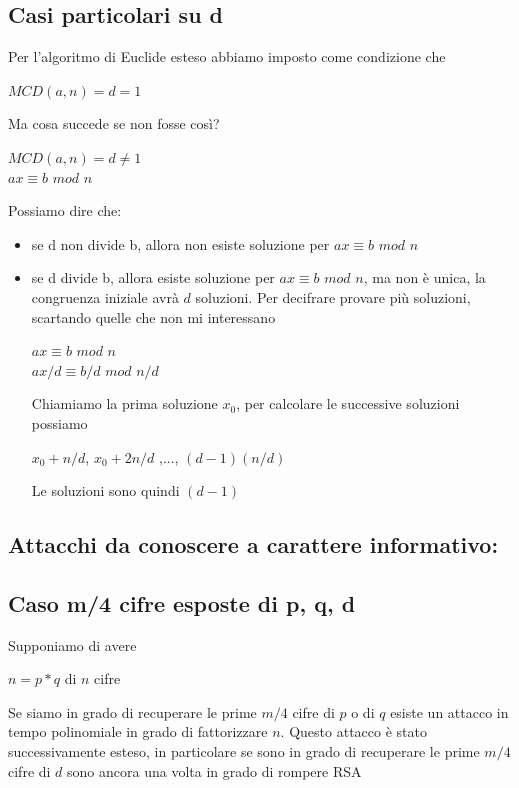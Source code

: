 \documentclass[11pt, oneside]{article}   	%
\begin{document}
\subsection*{Casi particolari su d}
Per l'algoritmo di Euclide esteso abbiamo imposto come condizione che \begin{center}
$MCD(a,n) = d = 1$
\end{center}
Ma cosa succede se non fosse così?
\begin{center}
$MCD(a,n) = d \neq 1$\\
$ax \equiv b$ $mod$ $n$
\end{center}
Possiamo dire che:\begin{itemize}
\item se d non divide b, allora non esiste soluzione per $ax \equiv b$ $mod$ $n$
\item se d divide b, allora esiste soluzione per $ax \equiv b$ $mod$ $n$, ma non è unica, la congruenza iniziale avrà $d$ soluzioni. Per decifrare provare più soluzioni, scartando quelle che non mi interessano
\begin{center}
$ax \equiv b$ $mod$ $n$\\
$ax/d \equiv b/d$ $mod$ $n/d$
\end{center}
Chiamiamo la prima soluzione $x_0$, per calcolare le successive soluzioni possiamo
\begin{center}
$x_0 + n/d$, $x_0 + 2n/d$ ,..., $(d-1)(n/d)$
\end{center}
Le soluzioni sono quindi $(d-1)$

\end{itemize}

\subsection*{Attacchi da conoscere a carattere informativo:}

\subsection*{Caso m/4 cifre esposte di p, q, d}
Supponiamo di avere\begin{center}
$n = p * q $ di $n$ cifre
\end{center}
Se siamo in grado di recuperare le prime $m/4$ cifre di $p$ o di $q$ esiste un attacco in tempo polinomiale in grado di fattorizzare $n$. Questo attacco è stato successivamente esteso, in particolare se sono in grado di recuperare le prime $m/4$ cifre di $d$  sono ancora una volta in grado di rompere RSA
\end{document}
